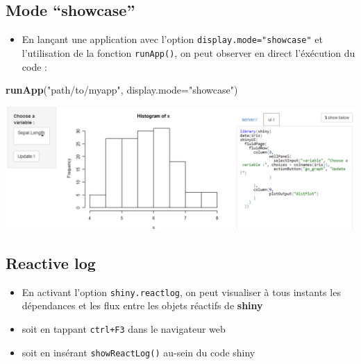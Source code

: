 \documentclass[
]{article}
\newenvironment{Shaded}{\begin{snugshade}}{\end{snugshade}}
\newcommand{\AttributeTok}[1]{\textcolor[rgb]{0.13,0.29,0.53}{#1}}
\newcommand{\CommentTok}[1]{\textcolor[rgb]{0.56,0.35,0.01}{\textit{#1}}}
\newcommand{\ConstantTok}[1]{\textcolor[rgb]{0.56,0.35,0.01}{#1}}
\newcommand{\FunctionTok}[1]{\textcolor[rgb]{0.13,0.29,0.53}{\textbf{#1}}}
\newcommand{\NormalTok}[1]{#1}
\newcommand{\OtherTok}[1]{\textcolor[rgb]{0.56,0.35,0.01}{#1}}
\newcommand{\SpecialCharTok}[1]{\textcolor[rgb]{0.81,0.36,0.00}{\textbf{#1}}}
\newcommand{\StringTok}[1]{\textcolor[rgb]{0.31,0.60,0.02}{#1}}
\providecommand{\tightlist}{%
  \setlength{\itemsep}{0pt}\setlength{\parskip}{0pt}}
\begin{document}
\hypertarget{mode-showcase}{%
\subsection{Mode ``showcase''}\label{mode-showcase}}

\begin{itemize}
\tightlist
\item
  En lançant une application avec l'option
  \texttt{display.mode="showcase"} et l'utilisation de la fonction
  \texttt{runApp()}, on peut observer en direct l'éxécution du code :
\end{itemize}

\begin{Shaded}
\begin{Highlighting}[]
\FunctionTok{runApp}\NormalTok{(}\StringTok{"path/to/myapp"}\NormalTok{, }\AttributeTok{display.mode=}\StringTok{"showcase"}\NormalTok{)}
\end{Highlighting}
\end{Shaded}

\includegraphics{img/debug_showcase.png}

\hypertarget{reactive-log}{%
\subsection{Reactive log}\label{reactive-log}}

\begin{itemize}
\tightlist
\item
  En activant l'option \texttt{shiny.reactlog}, on peut visualiser à
  tous instants les dépendances et les flux entre les objets réactifs de
  \textbf{shiny}
\item
  soit en tappant \texttt{ctrl+F3} dans le navigateur web
\item
  soit en insérant \texttt{showReactLog()} au-sein du code shiny
\end{itemize}

\begin{Shaded}
\end{Shaded}
\end{document}
